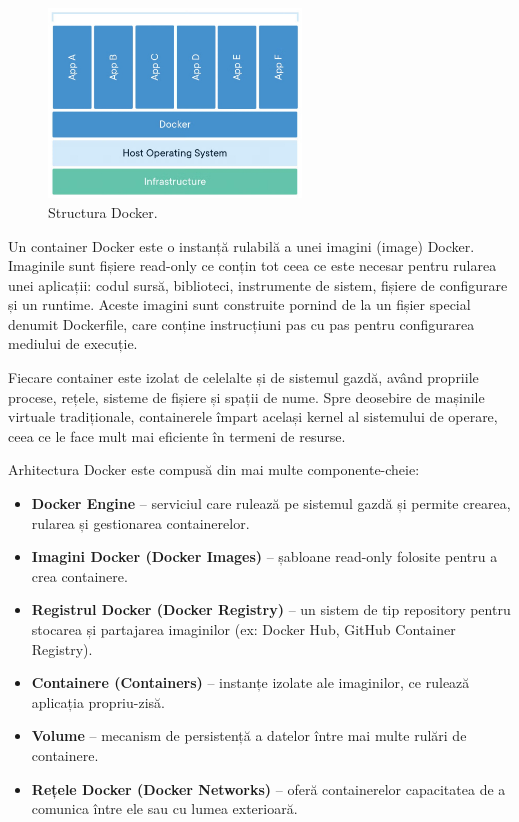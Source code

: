 \documentclass[titlepage,12pt]{article}
\DeclareRobustCommand{\code}[1]{{\ttfamily\small #1}}
\begin{document}
\begin{figure}[H]
\centering
\includegraphics[width=0.6\textwidth]{images/dockerstructure}
\caption{Structura Docker.}
\label{fig:containerstructure}
\end{figure}

Un container Docker este o instanță rulabilă a unei imagini (image) Docker.
Imaginile sunt fișiere read-only ce conțin tot ceea ce este necesar pentru rularea unei aplicații: codul sursă, biblioteci, instrumente de sistem, fișiere de configurare și un runtime.
Aceste imagini sunt construite pornind de la un fișier special denumit \code{Dockerfile}, care conține instrucțiuni pas cu pas pentru configurarea mediului de execuție.

Fiecare container este izolat de celelalte și de sistemul gazdă, având propriile procese, rețele, sisteme de fișiere și spații de nume.
Spre deosebire de mașinile virtuale tradiționale, containerele împart același kernel al sistemului de operare, ceea ce le face mult mai eficiente în termeni de resurse.

Arhitectura Docker este compusă din mai multe componente-cheie:

\begin{itemize}
\item \textbf{Docker Engine} – serviciul care rulează pe sistemul gazdă și permite crearea, rularea și gestionarea containerelor.
\item \textbf{Imagini Docker (Docker Images)} – șabloane read-only folosite pentru a crea containere.
\item \textbf{Registrul Docker (Docker Registry)} – un sistem de tip repository pentru stocarea și partajarea imaginilor (ex: Docker Hub, GitHub Container Registry).
\item \textbf{Containere (Containers)} – instanțe izolate ale imaginilor, ce rulează aplicația propriu-zisă.
\item \textbf{Volume} – mecanism de persistență a datelor între mai multe rulări de containere.
\item \textbf{Rețele Docker (Docker Networks)} – oferă containerelor capacitatea de a comunica între ele sau cu lumea exterioară.
\end{itemize}
\end{document}

